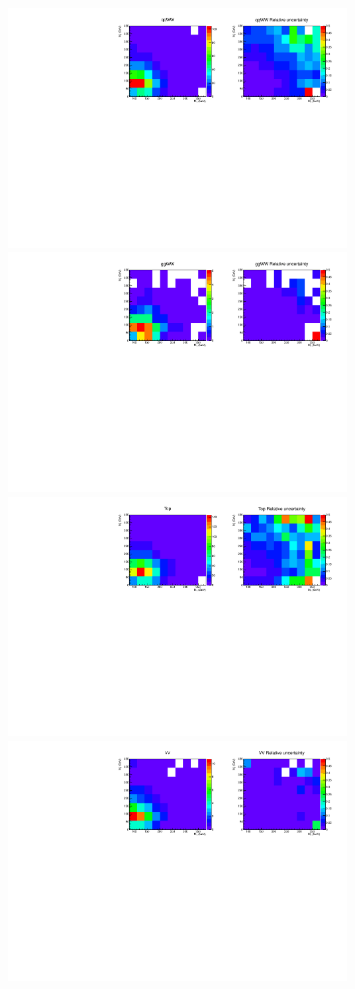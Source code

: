 \begin{figure}[htp]
\centering
\includegraphics[width=0.8\textwidth]{figures/2dtemplate_qqWW_mH400_1j.pdf}
\includegraphics[width=0.8\textwidth]{figures/2dtemplate_ggWW_mH400_1j.pdf}
\includegraphics[width=0.8\textwidth]{figures/2dtemplate_Top_mH400_1j.pdf}
\includegraphics[width=0.8\textwidth]{figures/2dtemplate_VV_mH400_1j.pdf}

\end{figure}

